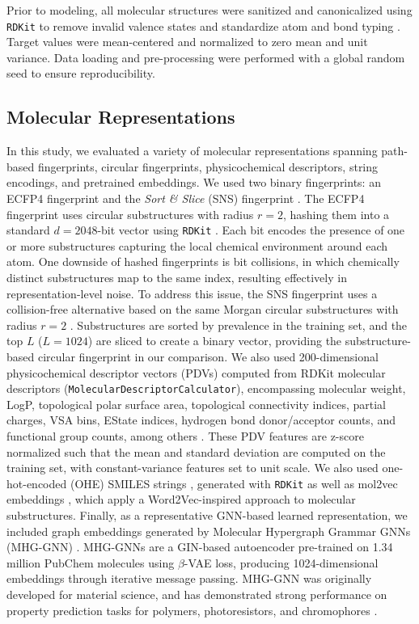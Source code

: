 \documentclass[pdflatex,sn-basic]{sn-jnl}%
\theoremstyle{thmstyleone}%
\theoremstyle{thmstyletwo}%
\theoremstyle{thmstylethree}%
\begin{document}
Prior to modeling, all molecular structures were sanitized and canonicalized using \texttt{RDKit} to remove invalid valence states and standardize atom and bond typing \citep{rdkit}. Target values were mean-centered and normalized to zero mean and unit variance. Data loading and pre-processing were performed with a global random seed to ensure reproducibility.

\subsection{Molecular Representations}

In this study, we evaluated a variety of molecular representations spanning path-based fingerprints, circular fingerprints, physicochemical descriptors, string encodings, and pretrained embeddings. We used two binary fingerprints: an ECFP4 fingerprint and the \emph{Sort \& Slice} (SNS) fingerprint \citep{sns}. The ECFP4 fingerprint uses circular substructures with radius $r=2$, hashing them into a standard $d=2048$-bit vector using \texttt{RDKit} \citep{rdkit}. Each bit encodes the presence of one or more substructures capturing the local chemical environment around each atom. One downside of hashed fingerprints is bit collisions, in which chemically distinct substructures map to the same index, resulting effectively in representation-level noise. To address this issue, the SNS fingerprint uses a collision-free alternative based on the same Morgan circular substructures with radius $r=2$ \citep{sns}. Substructures are sorted by prevalence in the training set, and the top $L$ ($L=1024$) are sliced to create a binary vector, providing the substructure-based circular fingerprint in our comparison. We also used 200-dimensional physicochemical descriptor vectors (PDVs) computed from RDKit molecular descriptors (\texttt{MolecularDescriptorCalculator}), encompassing molecular weight, LogP, topological polar surface area, topological connectivity indices, partial charges, VSA bins, EState indices, hydrogen bond donor/acceptor counts, and functional group counts, among others \citep{Cherkasov2014}. These PDV features are z-score normalized such that the mean and standard deviation are computed on the training set, with constant-variance features set to unit scale. We also used one-hot-encoded (OHE) SMILES strings \citep{Bertoni2020}, generated with \texttt{RDKit} \citep{rdkit} as well as mol2vec embeddings \citep{jaeger2018mol2vec}, which apply a Word2Vec-inspired approach to molecular substructures. Finally, as a representative GNN-based learned representation, we included graph embeddings generated by Molecular Hypergraph Grammar GNNs (MHG-GNN) \citep{kishimoto2023}. MHG-GNNs are a GIN-based autoencoder pre-trained on 1.34 million PubChem molecules using $\beta$-VAE loss, producing 1024-dimensional embeddings through iterative message passing. MHG-GNN was originally developed for material science, and has demonstrated strong performance on property prediction tasks for polymers, photoresistors, and chromophores \citep{kishimoto2023}. 
\end{document}
